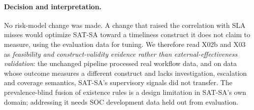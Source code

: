 \paragraph{Decision and interpretation.}
No risk-model change was made. A change that raised the correlation with SLA
misses would optimize SAT-SA toward a timeliness construct it does not claim to
measure, using the evaluation data for tuning. We therefore read X02b and X03 as
\emph{feasibility and construct-validity evidence rather than external-effectiveness
validation}: the unchanged pipeline processed real workflow data, and on data
whose outcome measures a different construct and lacks investigation, escalation
and coverage semantics, SAT-SA's supervisory signals did not transfer. The
prevalence-blind fusion of existence rules is a design limitation in SAT-SA's own
domain; addressing it needs SOC development data held out from evaluation.

